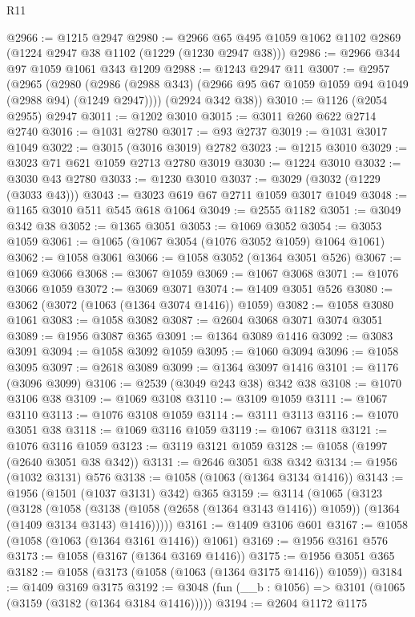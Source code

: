 \begin{lexlean}{R11}
\begin{coremodule}
@2966 := @1215 @2947
@2980 := @2966 @65 @495 @1059 @1062 @1102 @2869 (@1224 @2947 @38 @1102 (@1229 (@1230 @2947 @38)))
@2986 := @2966 @344 @97 @1059 @1061 @343 @1209
@2988 := @1243 @2947 @11
@3007 := @2957
    (@2965
      (@2980 (@2986 (@2988 @343) (@2966 @95 @67 @1059 @1059 @94 @1049 (@2988 @94) (@1249 @2947))))
      (@2924 @342 @38))
@3010 := @1126 (@2054 @2955) @2947
@3011 := @1202 @3010
@3015 := @3011 @260 @622 @2714 @2740
@3016 := @1031 @2780
@3017 := @93 @2737
@3019 := @1031 @3017 @1049
@3022 := @3015 (@3016 @3019) @2782
@3023 := @1215 @3010
@3029 := @3023 @71 @621 @1059 @2713 @2780 @3019
@3030 := @1224 @3010
@3032 := @3030 @43 @2780
@3033 := @1230 @3010
@3037 := @3029 (@3032 (@1229 (@3033 @43)))
@3043 := @3023 @619 @67 @2711 @1059 @3017 @1049
@3048 := @1165 @3010 @511 @545 @618 @1064
@3049 := @2555 @1182
@3051 := @3049 @342 @38
@3052 := @1365 @3051
@3053 := @1069 @3052
@3054 := @3053 @1059
@3061 := @1065 (@1067 @3054 (@1076 @3052 @1059) @1064 @1061)
@3062 := @1058 @3061
@3066 := @1058 @3052 (@1364 @3051 @526)
@3067 := @1069 @3066
@3068 := @3067 @1059
@3069 := @1067 @3068
@3071 := @1076 @3066 @1059
@3072 := @3069 @3071
@3074 := @1409 @3051 @526
@3080 := @3062 (@3072 (@1063 (@1364 @3074 @1416)) @1059)
@3082 := @1058 @3080 @1061
@3083 := @1058 @3082
@3087 := @2604 @3068 @3071 @3074 @3051
@3089 := @1956 @3087 @365
@3091 := @1364 @3089 @1416
@3092 := @3083 @3091
@3094 := @1058 @3092 @1059
@3095 := @1060 @3094
@3096 := @1058 @3095
@3097 := @2618 @3089
@3099 := @1364 @3097 @1416
@3101 := @1176 (@3096 @3099)
@3106 := @2539 (@3049 @243 @38) @342 @38
@3108 := @1070 @3106 @38
@3109 := @1069 @3108
@3110 := @3109 @1059
@3111 := @1067 @3110
@3113 := @1076 @3108 @1059
@3114 := @3111 @3113
@3116 := @1070 @3051 @38
@3118 := @1069 @3116 @1059
@3119 := @1067 @3118
@3121 := @1076 @3116 @1059
@3123 := @3119 @3121 @1059
@3128 := @1058 (@1997 (@2640 @3051 @38 @342))
@3131 := @2646 @3051 @38 @342
@3134 := @1956 (@1032 @3131) @576
@3138 := @1058 (@1063 (@1364 @3134 @1416))
@3143 := @1956 (@1501 (@1037 @3131) @342) @365
@3159 := @3114
    (@1065
      (@3123
        (@3128
          (@1058
            (@3138 (@1058 (@2658 (@1364 @3143 @1416)) @1059))
            (@1364 (@1409 @3134 @3143) @1416)))))
@3161 := @1409 @3106 @601
@3167 := @1058 (@1058 (@1063 (@1364 @3161 @1416)) @1061)
@3169 := @1956 @3161 @576
@3173 := @1058 (@3167 (@1364 @3169 @1416))
@3175 := @1956 @3051 @365
@3182 := @1058 (@3173 (@1058 (@1063 (@1364 @3175 @1416)) @1059))
@3184 := @1409 @3169 @3175
@3192 := @3048 (fun (__b : @1056) => @3101 (@1065 (@3159 (@3182 (@1364 @3184 @1416)))))
@3194 := @2604 @1172 @1175

\end{coremodule}
\end{lexlean}
